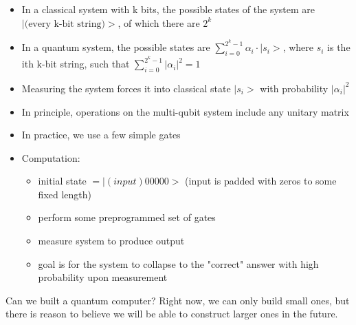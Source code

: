 
\begin{itemize}
	\item In a classical system with k bits, the possible states of the system are $|\text{(every k-bit string)}>$, of which there are $2^k$
	\item In a quantum system, the possible states are $\sum \limits_{i = 0}^{2^k-1} \alpha_i \cdot |s_i>$, where $s_i$ is the ith k-bit string, such that $\sum \limits_{i = 0}^{2^k-1} |\alpha_i|^2 = 1$
	\item Measuring the system forces it into classical state $|s_i>$ with probability $|\alpha_i|^2$
	\item In principle, operations on the multi-qubit system include any unitary matrix
	\item In practice, we use a few simple gates
	\item Computation:
		\begin{itemize}
			\item initial state $= |(input)00000>$ (input is padded with zeros to some fixed length)
			\item perform some preprogrammed set of gates
			\item measure system to produce output
			\item goal is for the system to collapse to the "correct" answer with high probability upon measurement
		\end{itemize}
\end{itemize}

Can we built a quantum computer? Right now, we can only build small ones, but there is reason to believe we will be able to construct larger ones in the future. 

